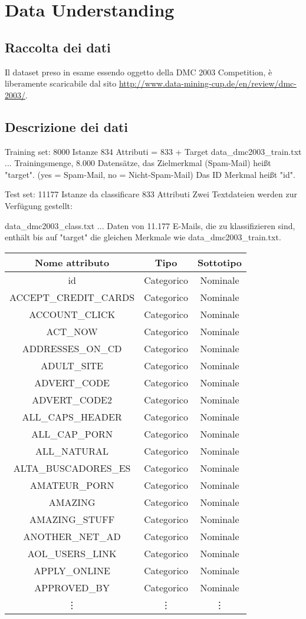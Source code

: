 \chapter{Data Understanding}
\section{Raccolta dei dati}
Il dataset preso in esame essendo oggetto della DMC 2003 Competition, è liberamente scaricabile dal sito \url{http://www.data-mining-cup.de/en/review/dmc-2003/}.
\section{Descrizione dei dati}
Training set: 8000 Istanze 834 Attributi = 833 + Target
data\_dmc2003\_train.txt ... Trainingsmenge, 8.000 Datensätze, das
Zielmerkmal (Spam-Mail) heißt "target".
(yes = Spam-Mail, no = Nicht-Spam-Mail)
Das ID Merkmal heißt "id".


Test set: 11177 Istanze da classificare 833 Attributi
Zwei Textdateien werden zur Verfügung gestellt:

data\_dmc2003\_class.txt ... Daten von 11.177 E-Mails, die zu
klassifizieren sind, enthält bis auf "target" die gleichen
Merkmale wie data\_dmc2003\_train.txt.


\begin{tabular}{ c | c | c}
	\textbf{Nome attributo} & \textbf{Tipo} & \textbf{Sottotipo} \\
	\hline
	id & Categorico & Nominale \\ 
	ACCEPT\_CREDIT\_CARDS & Categorico & Nominale \\ 
	ACCOUNT\_CLICK & Categorico & Nominale \\ 
	ACT\_NOW & Categorico & Nominale \\ 
	ADDRESSES\_ON\_CD & Categorico & Nominale \\ 
	ADULT\_SITE & Categorico & Nominale \\ 
	ADVERT\_CODE & Categorico & Nominale \\ 
	ADVERT\_CODE2 & Categorico & Nominale \\ 
	ALL\_CAPS\_HEADER & Categorico & Nominale \\ 
	ALL\_CAP\_PORN & Categorico & Nominale \\ 
	ALL\_NATURAL & Categorico & Nominale \\ 
	ALTA\_BUSCADORES\_ES & Categorico & Nominale \\ 
	AMATEUR\_PORN & Categorico & Nominale \\ 
	AMAZING & Categorico & Nominale \\ 
	AMAZING\_STUFF & Categorico & Nominale \\ 
	ANOTHER\_NET\_AD & Categorico & Nominale \\ 
	AOL\_USERS\_LINK & Categorico & Nominale \\ 
	APPLY\_ONLINE & Categorico & Nominale \\ 
	APPROVED\_BY & Categorico & Nominale \\ 
	\vdots  &  \vdots  &  \vdots  \\
	\end{tabular}

